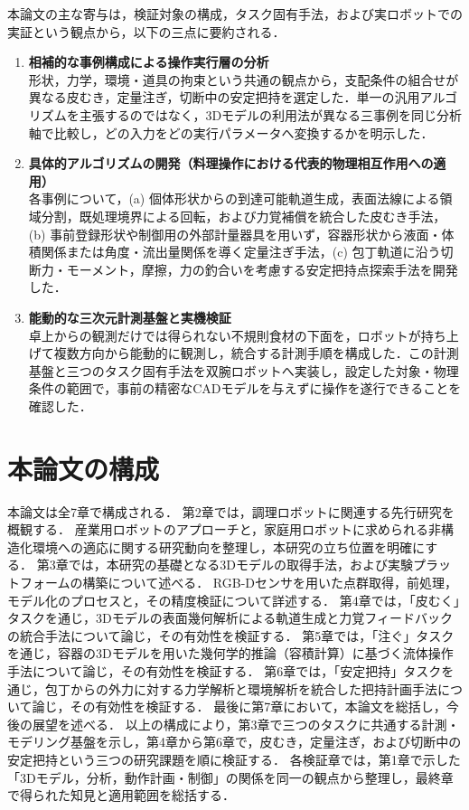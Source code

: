 \begin{revisionblock}
本論文の主な寄与は，検証対象の構成，タスク固有手法，および実ロボットでの実証という観点から，以下の三点に要約される．

\begin{enumerate}

\item \textbf{相補的な事例構成による操作実行層の分析} \\
形状，力学，環境・道具の拘束という共通の観点から，支配条件の組合せが異なる皮むき，定量注ぎ，切断中の安定把持を選定した．単一の汎用アルゴリズムを主張するのではなく，3Dモデルの利用法が異なる三事例を同じ分析軸で比較し，どの入力をどの実行パラメータへ変換するかを明示した．

\item \textbf{具体的アルゴリズムの開発（料理操作における代表的物理相互作用への適用）} \\
各事例について，(a) 個体形状からの到達可能軌道生成，表面法線による領域分割，既処理境界による回転，および力覚補償を統合した皮むき手法，(b) 事前登録形状や制御用の外部計量器具を用いず，容器形状から液面・体積関係または角度・流出量関係を導く定量注ぎ手法，(c) 包丁軌道に沿う切断力・モーメント，摩擦，力の釣合いを考慮する安定把持点探索手法を開発した．

\item \textbf{能動的な三次元計測基盤と実機検証} \\
卓上からの観測だけでは得られない不規則食材の下面を，ロボットが持ち上げて複数方向から能動的に観測し，統合する計測手順を構成した．この計測基盤と三つのタスク固有手法を双腕ロボットへ実装し，設定した対象・物理条件の範囲で，事前の精密なCADモデルを与えずに操作を遂行できることを確認した．

\end{enumerate}
\end{revisionblock}

\section{本論文の構成}


本論文は全7章で構成される．
第2章では，調理ロボットに関連する先行研究を概観する．
産業用ロボットのアプローチと，家庭用ロボットに求められる非構造化環境への適応に関する研究動向を整理し，本研究の立ち位置を明確にする．
第3章では，本研究の基礎となる3Dモデルの取得手法，および実験プラットフォームの構築について述べる．
RGB-Dセンサを用いた点群取得，前処理，モデル化のプロセスと，その精度検証について詳述する．
第4章では，「皮むく」タスクを通じ，3Dモデルの表面幾何解析による軌道生成と力覚フィードバックの統合手法について論じ，その有効性を検証する．
第5章では，「注ぐ」タスクを通じ，容器の3Dモデルを用いた幾何学的推論（容積計算）に基づく流体操作手法について論じ，その有効性を検証する．
第6章では，「安定把持」タスクを通じ，包丁からの外力に対する力学解析と環境解析を統合した把持計画手法について論じ，その有効性を検証する．
最後に第7章において，本論文を総括し，今後の展望を述べる．
以上の構成により，第3章で三つのタスクに共通する計測・モデリング基盤を示し，第4章から第6章で，皮むき，定量注ぎ，および切断中の安定把持という三つの研究課題を順に検証する．
各検証章では，第1章で示した「3Dモデル，分析，動作計画・制御」の関係を同一の観点から整理し，最終章で得られた知見と適用範囲を総括する．



